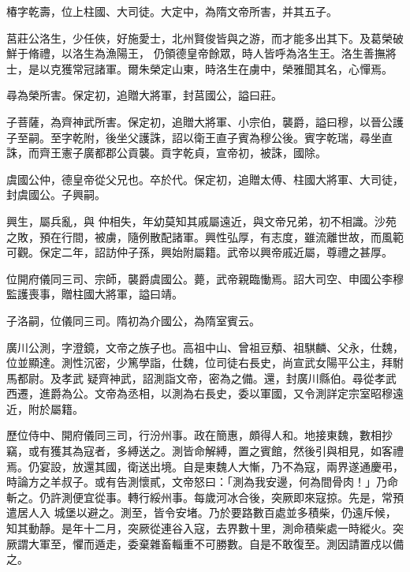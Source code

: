 \begin{pinyinscope}
 椿字乾壽，位上柱國、大司徒。大定中，為隋文帝所害，并其五子。



 莒莊公洛生，少任俠，好施愛士，北州賢俊皆與之游，而才能多出其下。及葛榮破鮮于脩禮，以洛生為漁陽王，
 仍領德皇帝餘眾，時人皆呼為洛生王。洛生善撫將士，是以克獲常冠諸軍。爾朱榮定山東，時洛生在虜中，榮雅聞其名，心憚焉。



 尋為榮所害。保定初，追贈大將軍，封莒國公，謚曰莊。



 子菩薩，為齊神武所害。保定初，追贈大將軍、小宗伯，襲爵，謚曰穆，以晉公護子至嗣。至字乾附，後坐父護誅，詔以衛王直子賓為穆公後。賓字乾瑞，尋坐直誅，而齊王憲子廣都郡公貢襲。貢字乾貞，宣帝初，被誅，國除。



 虞國公仲，德皇帝從父兄也。卒於代。保定初，追贈太傅、柱國大將軍、大司徒，封虞國公。子興嗣。



 興生，屬兵亂，與
 仲相失，年幼莫知其戚屬遠近，與文帝兄弟，初不相識。沙苑之敗，預在行間，被虜，隨例散配諸軍。興性弘厚，有志度，雖流離世故，而風範可觀。保定二年，詔訪仲子孫，興始附屬籍。武帝以興帝戚近屬，尊禮之甚厚。



 位開府儀同三司、宗師，襲爵虞國公。薨，武帝親臨慟焉。詔大司空、申國公李穆監護喪事，贈柱國大將軍，謚曰靖。



 子洛嗣，位儀同三司。隋初為介國公，為隋室賓云。



 廣川公測，字澄鏡，文帝之族子也。高祖中山、曾祖豆頺、祖騏麟、父永，仕魏，位並顯達。測性沉密，少篤學詣，仕魏，位司徒右長史，尚宣武女陽平公主，拜駙馬都尉。及孝武
 疑齊神武，詔測詣文帝，密為之備。還，封廣川縣伯。尋從孝武西遷，進爵為公。文帝為丞相，以測為右長史，委以軍國，又令測詳定宗室昭穆遠近，附於屬籍。



 歷位侍中、開府儀同三司，行汾州事。政在簡惠，頗得人和。地接東魏，數相抄竊，或有獲其為寇者，多縛送之。測皆命解縛，置之賓館，然後引與相見，如客禮焉。仍宴設，放還其國，衛送出境。自是東魏人大慚，乃不為寇，兩界遂通慶弔，時論方之羊叔子。或有告測懷貳，文帝怒曰：「測為我安邊，何為間骨肉！」乃命斬之。仍許測便宜從事。轉行綏州事。每歲河冰合後，突厥即來寇掠。先是，常預遣居人入
 城堡以避之。測至，皆令安堵。乃於要路數百處並多積柴，仍遠斥候，知其動靜。是年十二月，突厥從連谷入寇，去界數十里，測命積柴處一時縱火。突厥謂大軍至，懼而遁走，委棄雜畜輜重不可勝數。自是不敢復至。測因請置戍以備之。




\end{pinyinscope}
